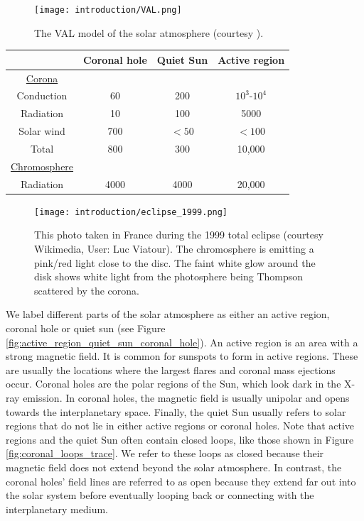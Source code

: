 \begin{figure}[!htp]
    \centering
    \texttt{[image: introduction/VAL.png]}
    \caption{The VAL model \citep{Vernazza1981} of the solar atmosphere (courtesy \citet{Williams2018}).}
    \label{fig:VAL_atmosphere}
\end{figure}

\begin{table}[!htp]
    \centering
    \begin{tabular}{c c c c}
        \hline
         & Coronal hole & Quiet Sun & Active region \\
        \hline
        \underline{Corona}  \\
        Conduction & 60 & 200 & $10^3\text{-}10^4$ \\
        Radiation & 10 & 100 & 5000 \\
        Solar wind & 700 & $<50$ & $<100$ \\
        \hline
        Total & 800 & 300 & 10,000 \\
        \hline
        \underline{Chromosphere} \\
        Radiation & 4000 & 4000 & 20,000
        
    \end{tabular}
    \label{tab:energy_losses_corona_chromosphere}
\end{table}

\begin{figure}[!htp]
    \centering
    \texttt{[image: introduction/eclipse\_1999.png]}
    \caption{This photo taken in France during the 1999 total eclipse (courtesy Wikimedia, User: Luc Viatour). The chromosphere is emitting a pink/red light close to the disc. The faint white glow around the disk shows white light from the photosphere being Thompson scattered by the corona.}
    \label{fig:total_eclipse1999}
\end{figure}

We label different parts of the solar atmosphere as either an active region, coronal hole or quiet sun (see Figure \ref{fig:active_region_quiet_sun_coronal_hole}). An active region is an area with a strong magnetic field. It is common for sunspots to form in active regions. These are usually the locations where the largest flares and coronal mass ejections occur. Coronal holes are the polar regions of the Sun, which look dark in the X-ray emission. In coronal holes, the magnetic field is usually unipolar and opens towards the interplanetary space. Finally, the quiet Sun usually refers to solar regions that do not lie in either active regions or coronal holes. Note that active regions and the quiet Sun often contain closed loops, like those shown in Figure \ref{fig:coronal_loops_trace}. We refer to these loops as closed because their magnetic field does not extend beyond the solar atmosphere. In contrast, the coronal holes' field lines are referred to as open because they extend far out into the solar system before eventually looping back or connecting with the interplanetary medium.

